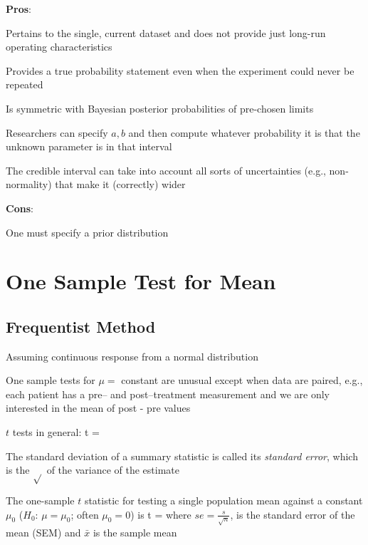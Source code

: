 \textbf{Pros}:
\bi
\item Pertains to the single, current dataset and does not provide just long-run operating characteristics
\item Provides a true probability statement even when the experiment could never be repeated
\item Is symmetric with Bayesian posterior probabilities of pre-chosen limits
  \bi
  \item Researchers can specify $a, b$ and then compute whatever probability it is that the unknown parameter is in that interval
  \ei
\item The credible interval can take into account all sorts of uncertainties (e.g., non-normality) that make it (correctly) wider
\ei

\textbf{Cons}:
\bi
\item One must specify a prior distribution
\ei

\section{One Sample Test for Mean} 
\subsection{Frequentist Method}
\bi
\item Assuming continuous response from a normal distribution
\item One sample tests for $\mu =$ constant are unusual except when
  data are paired, e.g., each patient has a pre-- and post--treatment
  measurement and we are only interested in the mean of post - pre
  values
\item $t$ tests in general:
\beq
t = 
\eeq
\item The standard deviation of a summary statistic is called its
  \emph{standard error}, which is the $\sqrt{}$ of the variance of the
  estimate 
\item The one-sample $t$ statistic for testing a single population
  mean against a constant $\mu_0$ ($H_{0}$: $\mu = \mu_{0}$; often
  $\mu_{0} = 0$) is 
\beq
t = 
\eeq
where $se = \frac{s}{\sqrt{n}}$, is the standard error of the mean (SEM) and $\bar{x}$ is the sample mean

